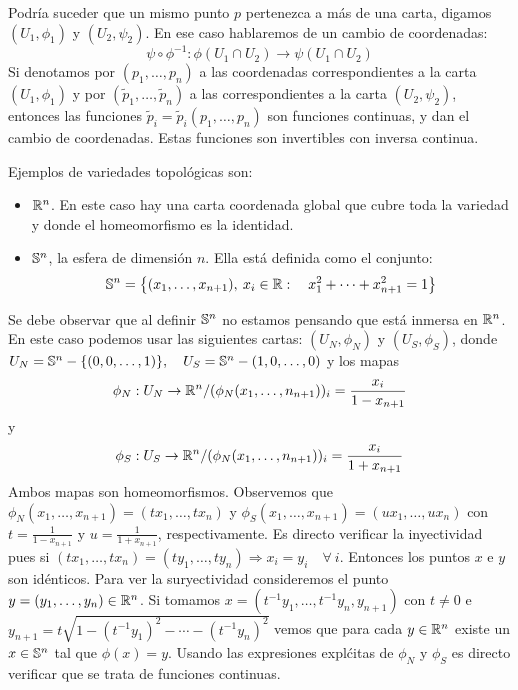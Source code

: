 Podr\'ia suceder que un mismo punto $p$ pertenezca a m\'as de una carta, digamos
$(U_1,\phi_1)$  y  $(U_2,\psi_2)$.  En  ese  caso  hablaremos  de un  cambio  de
coordenadas:
%
\begin{equation}\label{cc}
\psi \circ \phi^{-1}: \phi(U_1 \cap U_2) \rightarrow \psi(U_1 \cap U_2)
\end{equation}
%
Si denotamos por $(p_1 , \ldots  , p_n)$ a las coordenadas correspondientes a la
carta  $(U_1,\phi_1)$  y  por  $(\tilde{p}_1  , \ldots  ,  \tilde{p}_n)$  a  las
correspondientes a la carta  $(U_2,\psi_2)$, entonces las funciones $\tilde{p}_i
= \tilde{p}_i(p_1 ,  \ldots , p_n)$ son funciones continuas, y  dan el cambio de
coordenadas. Estas funciones son invertibles con inversa continua.

Ejemplos de variedades topol\'ogicas son:
%
\begin{itemize}
\item $\mathbb{R}^n$. En este caso hay  una carta coordenada global que cubre toda la
  variedad y donde el homeomorfismo es la identidad.
%
\item $\mathbb{S}^n$, la esfera de dimensi\'on $n$. Ella est\'a definida como el conjunto:
  \[
  \mathbb{S}^n = \left\{  (x_1 , \ldots ,  x_{n+1}), \: x_i \in \mathbb{R}:  \quad x_1^2 +
    \cdots + x_{n+1}^2 = 1 \right\}
  \]
\end{itemize}
%
\noindent  Se debe observar  que al  definir $\mathbb{S}^n$  no estamos  pensando que
est\'a inmersa  en $\mathbb{R}^n$. En este  caso podemos usar  las siguientes cartas:
$(U_N,  \phi_N)$ y $(U_S,\phi_S)$,  donde $U_N  = \mathbb{S}^n-\{  (0,0,\ldots,1) \},
\quad U_S = \mathbb{S}^n -{(1,0,\ldots,0)}$ y los mapas
%
\[
\phi_N:  U_N  \rightarrow  \mathbb{R}^n  /  (\phi_N(x_1  ,  \ldots  ,  n_{n+1}))_i  =
\frac{x_i}{1-x_{n+1}}
\]
%
y
%
\[
\phi_S:  U_S  \rightarrow  \mathbb{R}^n  /  (\phi_N(x_1  ,  \ldots  ,  n_{n+1}))_i  =
\frac{x_i}{1+x_{n+1}}
\]
%
Ambos mapas son homeomorfismos.  Observemos  que $\phi_N(x_1 , \ldots , x_{n+1})
= (t x_1 , \ldots , t x_n)$ y  $\phi_S(x_1 , \ldots , x_{n+1}) = (u x_1 , \ldots
,  u  x_n)$   con  $t  =  \frac{1}{1-x_{n+1}}$  y   $u  =  \frac{1}{1+x_{n+1}}$,
respectivamente.  Es directo verificar la  inyectividad pues si $(t x_1 , \ldots
, t x_n) = (t  y_1 , \ldots , t y_n) \Rightarrow x_i =  y_i \quad \forall \: i$.
Entonces  los puntos  $x$  e $y$  son  id\'enticos.  Para  ver la  suryectividad
consideremos el punto  $y = (y_1 , \ldots  , y_n) \in \mathbb{R}^n$. Si  tomamos $x =
\left( t^{-1}  y_1 ,  \ldots , t^{-1}  y_n ,  y_{n+1} \right)$ con  $t \ne  0$ e
$y_{n+1} =  t \sqrt{1-(t^{-1}  y_1)^2 - \cdots  - \left( t^{-1}  y_n \right)^2}$
vemos que para cada $y \in \mathbb{R}^n$ existe un $x \in \mathbb{S}^n$ tal que $\phi(x) =
y$.   Usando las  expresiones  expl\'citas  de $\phi_N$  y  $\phi_S$ es  directo
verificar que se trata de funciones continuas.

